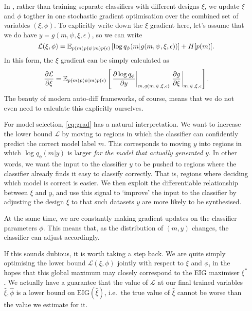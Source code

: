 \documentclass[a4paper, 10pt]{report}
\theoremstyle{plain}
\begin{document}
	In \citet{foster2020unified}, rather than training separate classifiers with different designs $\xi$, we update $\xi$ and $\phi$ togther in one stochastic gradient optimisation over the combined set of variables $(\xi,\phi)$.
	To explicitly write down the $\xi$ gradient here, let's assume that we do have $y = g(m,\psi,\xi,\epsilon)$, so we can write
	\begin{equation}
	\mathcal{L}(\xi,\phi) = \mathbb{E}_{p(m)p(\psi|m)p(\epsilon)}\left[ \log q_\phi(m|g(m,\psi,\xi,\epsilon)) \right] + H[p(m)].
	\end{equation}
	In this form, the $\xi$ gradient can be simply calculated as
	\begin{equation}
	\label{eq:grad}
	\frac{\partial \mathcal{L}}{\partial \xi} = \mathbb{E}_{p(m)p(\psi|m)p(\epsilon)}\left[ \left.\frac{\partial \log q_\phi}{\partial y}\right\vert_{m,g(m,\psi,\xi,\epsilon)}\left.\frac{\partial g}{\partial \xi}\right\vert_{m,\psi,\xi,\epsilon} \right].
	\end{equation}
	The beauty of modern auto-diff frameworks, of course, means that we do not even need to calculate this explicitly ourselves.
	
	For model selection, \eqref{eq:grad} has a natural interpretation. 
	We want to increase the lower bound $\mathcal{L}$ by moving to regions in which the classifier can confidently predict the correct model label $m$. This corresponds to moving $y$ into regions in which $\log q_\phi(m|y)$ is larger \emph{for the model that actually generated $y$}.
	In other words, we want the input to the classifier $y$ to be pushed to regions where the classifier already finds it easy to classify correctly.
	That is, regions where deciding which model is correct is easier.
	We then exploit the differentiable relationship between $\xi$ and $y$, and use this signal to `improve' the input to the classifier by adjusting the design $\xi$ to that such datasets $y$ are more likely to be synthesised.
	
	At the same time, we are constantly making gradient updates on the classifier parameters $\phi$. This means that, as the distribution of $(m,y)$ changes, the classifier can adjust accordingly.
	
	If this sounds dubious, it is worth taking a step back. We are quite simply optimising the lower bound $\mathcal{L}(\xi,\phi)$ jointly with respect to $\xi$ and $\phi$, in the hopes that this global maximum may closely correspond to the EIG maximiser $\xi^*$.
	We actually have a guarantee that the value of $\mathcal{L}$ at our final trained variables $\hat{\xi},\hat{\phi}$ is a lower bound on $\text{EIG}(\hat{\xi})$, i.e.~the true value of $\hat{\xi}$ cannot be worse than the value we estimate for it.
	
\end{document}
